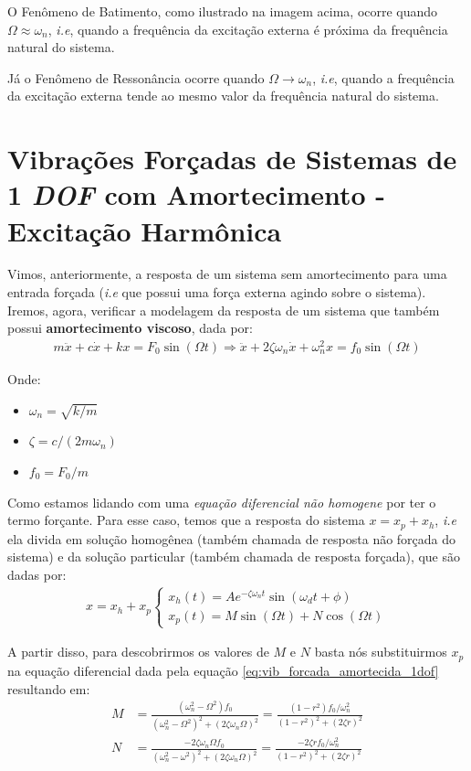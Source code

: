 \documentclass{article}
\newcommand{\n}{\nonumber \\ }
\begin{document}
O Fenômeno de Batimento, como ilustrado na imagem acima, ocorre quando $\Omega \approx \omega_n$, \emph{i.e}, quando a frequência da excitação externa é próxima da frequência natural
do sistema.

Já o Fenômeno de Ressonância ocorre quando $\Omega \rightarrow \omega_n$, \emph{i.e}, quando a  frequência da excitação externa tende ao mesmo valor da frequência natural do sistema.




\newpage
\section{Vibrações Forçadas de Sistemas de 1 \emph{DOF} com Amortecimento - Excitação Harmônica}
Vimos, anteriormente, a resposta de um sistema sem amortecimento para uma entrada forçada (\emph{i.e} que possui uma força externa agindo sobre o sistema). Iremos, agora, verificar a modelagem
da resposta de um sistema que também possui \textbf{amortecimento viscoso}, dada por:
\begin{align}
    m\ddot x + c\dot x + kx = F_0\sin(\Omega t) \Rightarrow \ddot x + 2 \zeta \omega_n \dot x + \omega_n^2 x = f_0 \sin(\Omega t) \label{eq:vib_forcada_amortecida_1dof}
\end{align}

Onde:
\begin{itemize}
    \item $\omega_n = \sqrt{k/m}$
    \item $\zeta = c/(2m\omega_n)$
    \item $f_0=F_0/m$
\end{itemize}

Como estamos lidando com uma \emph{equação diferencial não homogene} por ter o termo forçante. Para esse caso, temos que a resposta do sistema $x = x_p + x_h$, \emph{i.e} ela divida em solução
homogênea (também chamada de resposta não forçada do sistema) e da solução particular (também chamada de resposta forçada), que são dadas por:
\begin{align}
    x = x_h + x_p\begin{cases}x_h(t) = Ae^{-\zeta \omega_n t} \sin(\omega_d t + \phi) \\ x_p(t) = M\sin(\Omega t) + N \cos{(\Omega t)}\end{cases}
\end{align}

A partir disso, para descobrirmos os valores de $M$ e $N$ basta nós substituirmos $x_p$ na equação diferencial dada pela equação \ref{eq:vib_forcada_amortecida_1dof} resultando em:
\begin{align}
    M & = \frac{(\omega_n^2 - \Omega^2)f_0}{(\omega_n^2 - \Omega^2)^2 + (2\zeta \omega_n\Omega)^2} = \frac{(1 - r^2) f_0/\omega_n^2}{(1 - r^2)^2 + (2 \zeta r)^2} \n
    N & = \frac{-2\zeta \omega_n \Omega f_0}{(\omega_n^2 - \omega^2)^2 + (2\zeta\omega_n\Omega)^2} = \frac{-2\zeta r f_0/\omega_n^2}{(1 - r^2)^2 + (2\zeta r)^2}
\end{align}
\end{document}

